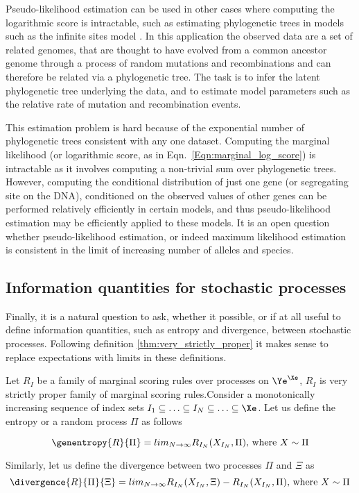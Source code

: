 Pseudo-likelihood estimation can be used in other cases where computing the logarithmic score is intractable, such as estimating phylogenetic trees in models such as the infinite sites model \citep{something, something} . In this application the observed data are a set of related genomes, that are thought to have evolved from a common ancestor genome through a process of random mutations and recombinations and can therefore be related via a phylogenetic tree. The task is to infer the latent phylogenetic tree underlying the data, and to estimate model parameters such as the relative rate of mutation and recombination events.

This estimation problem is hard because of the exponential number of phylogenetic trees consistent with any one dataset. Computing the marginal likelihood (or logarithmic score, as in Eqn.\ \eqref{Eqn:marginal_log_score}) is intractable as it involves computing a non-trivial sum over phylogenetic trees. However, computing the conditional distribution of just one gene (or segregating site on the DNA), conditioned on the observed values of other genes can be performed relatively efficiently in certain models, and thus pseudo-likelihood estimation may be efficiently applied to these models. It is an open question whether pseudo-likelihood estimation, or indeed maximum likelihood estimation is consistent in the limit of increasing number of alleles and species.

\subsection{Information quantities for stochastic processes}

Finally, it is a natural question to ask, whether it possible, or if at all useful to define information quantities, such as entropy and divergence, between stochastic processes. Following definition \ref{thm:very_strictly_proper} it makes sense to replace expectations with limits in these definitions.

\begin{definition}\label{thm:process_entropy_divergence}
Let $R_{I}$ be a family of marginal scoring rules over processes on $\Ye^{\Xe}$, $R_{I}$ is very strictly proper family of marginal scoring rules.Consider a monotonically increasing sequence of index sets $I_1\subseteq\ldots\subseteq I_N \subseteq \ldots \subseteq \Xe$. Let us define the entropy or a random process $\Pi$ as follows

\begin{equation}
	\genentropy{R}{\Pi} = lim_{N\rightarrow\infty}R_{I_N}(X_{I_N},\Pi) \mbox{, where } X \sim \Pi
\end{equation}

Similarly, let us define the divergence between two processes $\Pi$ and $\Xi$ as
\begin{equation}
	\divergence{R}{\Pi}{\Xi} =  lim_{N\rightarrow\infty}R_{I_N}(X_{I_N},\Xi) - R_{I_N}(X_{I_N},\Pi) \mbox{, where } X \sim \Pi
\end{equation}
\end{definition}

